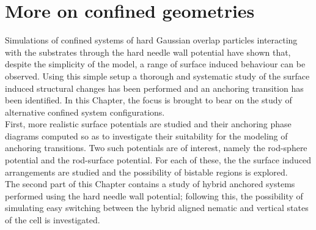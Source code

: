 

\chapter{More on confined geometries}
\label{chap:five}

\introduction

Simulations of confined systems of hard Gaussian overlap particles interacting with the
substrates through the hard needle wall potential have shown that, despite the simplicity 
of the model, a range of surface induced behaviour can be observed. Using this simple setup 
a thorough and systematic study of the surface induced structural changes has been performed 
and an anchoring transition has been identified. In this Chapter, the focus is 
brought to bear on the study of alternative confined system configurations.\\
%
First, more realistic surface potentials are studied and their anchoring phase diagrams computed 
so as to investigate their suitability for the modeling of anchoring transitions. Two such 
potentials are of interest, namely the rod-sphere potential and the rod-surface potential. For
each of these, the the surface induced arrangements are studied and the possibility of 
bistable regions is explored.\\
%
The second part of this Chapter contains a study of hybrid anchored systems performed
using the hard needle wall potential; following this, the possibility of simulating 
easy switching between the hybrid aligned nematic and vertical states of the cell is investigated.









